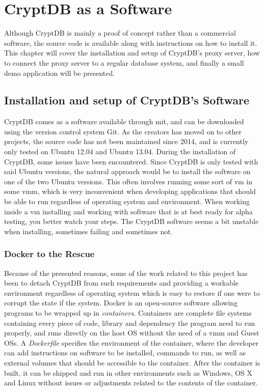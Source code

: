 \chapter{CryptDB as a Software}
\label{chp:software}

Although CryptDB is mainly a proof of concept rather than a commercial software, the source code is available along with instructions on how to install it. This chapter will cover the installation and setup of CryptDB's proxy server, how to connect the proxy server to a regular database system, and finally a small demo application will be presented.

\section{Installation and setup of CryptDB's Software}

CryptDB comes as a software available through \gls{mit}, and can be downloaded using the version control system Git. As the creators has moved on to other projects, the source code has not been maintained since 2014, and is currently only tested on Ubuntu 12.04 and Ubuntu 13.04. During the installation of CryptDB, some issues have been encountered. Since CryptDB is only tested with said Ubuntu versions, the natural approach would be to install the software on one of the two Ubuntu versions. This often involves running some sort of \gls{vm} in some \gls{vmm}, which is very inconvenient when developing applications that should be able to run regardless of operating system and environment. When working inside a \gls{vm} installing and working with software that is at best ready for alpha testing, you better watch your steps. The CryptDB software seems a bit unstable when installing, sometimes failing and sometimes not. 


\subsection{Docker to the Rescue}


Because of the presented reasons, some of the work related to this project has been to detach CryptDB from such requirements and providing a workable environment regardless of operating system which is easy to restore if one were to corrupt the state if the system. Docker \cite{docker_homepage} is an open-source software allowing programs to be wrapped up in \emph{containers}. Containers are complete file systems containing every piece of code, 
library and dependency the program need to run properly, and runs directly on the host OS without the need of a \gls{vmm} and Guest OSs. A \emph{Dockerfile} specifies the environment of the container, where the developer can add instructions on software to be installed, commands to run, as well as external volumes that should be accessible to the container. After the container is built, it can be shipped and run in other environments such as Windows, OS X and Linux without issues or adjustments related to the contents of the container.

